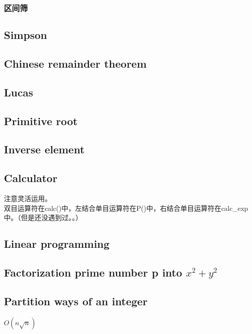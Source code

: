 \subsubsection{区间筛}

\subsection{Simpson}


\subsection{Chinese remainder theorem}


\subsection{Lucas}


\subsection{Primitive root}

\subsection{Inverse element}


\subsection{Calculator}
注意灵活运用。\\
双目运算符在calc()中，左结合单目运算符在P()中，右结合单目运算符在calc\_exp中。（但是还没遇到过。。）\\


\subsection{Linear programming}


\subsection{Factorization prime number p into $x^2+y^2$ }


\subsection{Partition ways of an integer}
$O(n\sqrt{n})$


